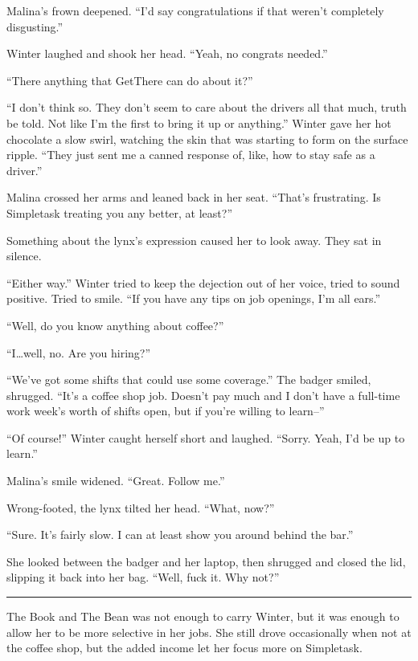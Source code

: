 Malina's frown deepened. ``I'd say congratulations if that weren't completely disgusting.''

Winter laughed and shook her head. ``Yeah, no congrats needed.''

``There anything that GetThere can do about it?''

``I don't think so. They don't seem to care about the drivers all that much, truth be told. Not like I'm the first to bring it up or anything.'' Winter gave her hot chocolate a slow swirl, watching the skin that was starting to form on the surface ripple. ``They just sent me a canned response of, like, how to stay safe as a driver.''

Malina crossed her arms and leaned back in her seat. ``That's frustrating. Is Simpletask treating you any better, at least?''

Something about the lynx's expression caused her to look away. They sat in silence.

``Either way.'' Winter tried to keep the dejection out of her voice, tried to sound positive. Tried to smile. ``If you have any tips on job openings, I'm all ears.''

``Well, do you know anything about coffee?''

``I\ldots well, no. Are you hiring?''

``We've got some shifts that could use some coverage.'' The badger smiled, shrugged. ``It's a coffee shop job. Doesn't pay much and I don't have a full-time work week's worth of shifts open, but if you're willing to learn--''

``Of course!'' Winter caught herself short and laughed. ``Sorry. Yeah, I'd be up to learn.''

Malina's smile widened. ``Great. Follow me.''

Wrong-footed, the lynx tilted her head. ``What, now?''

``Sure. It's fairly slow. I can at least show you around behind the bar.''

She looked between the badger and her laptop, then shrugged and closed the lid, slipping it back into her bag. ``Well, fuck it. Why not?''

\begin{center}\rule{0.5\linewidth}{0.5pt}\end{center}

The Book and The Bean was not enough to carry Winter, but it was enough to allow her to be more selective in her jobs. She still drove occasionally when not at the coffee shop, but the added income let her focus more on Simpletask.

